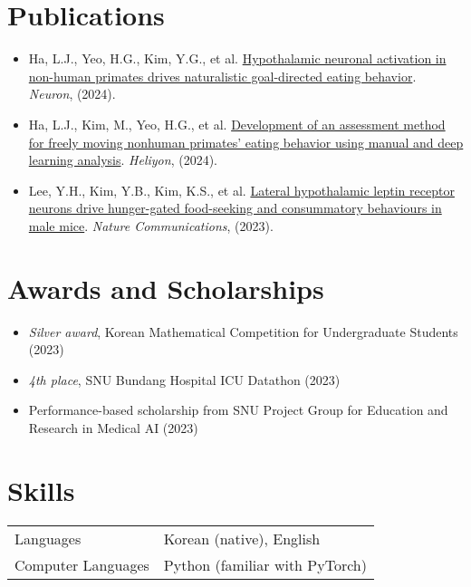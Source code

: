 \documentclass[11pt, a4paper]{article}
\newenvironment{customitemize}
	{\begin{itemize}[leftmargin=*, noitemsep, topsep=0pt, label=$\cdot$]}
	{\end{itemize}}
\begin{document}
\section*{Publications}
\begin{customitemize}
    \item Ha, L.J., Yeo, H.G., Kim, Y.G., et al. \href{https://doi.org/10.1016/j.neuron.2024.03.029}{Hypothalamic neuronal activation in non-human primates drives naturalistic goal-directed eating behavior}. {\it Neuron}, (2024). 
    \item Ha, L.J., Kim, M., Yeo, H.G., et al. \href{https://doi.org/10.1016/j.heliyon.2024.e25561}{Development of an assessment method for freely moving nonhuman primates' eating behavior using manual and deep learning analysis}. {\it Heliyon}, (2024). 
    \item Lee, Y.H., Kim, Y.B., Kim, K.S., et al. \href{https://doi.org/10.1038/s41467-023-37044-4}{Lateral hypothalamic leptin receptor neurons drive hunger-gated food-seeking and consummatory behaviours in male mice}. {\it Nature Communications}, (2023). 
\end{customitemize}


\section*{Awards and Scholarships}
\begin{customitemize}
    \item \textit{Silver award}, Korean Mathematical Competition for Undergraduate Students (2023)
    \item \textit{4th place}, SNU Bundang Hospital ICU Datathon (2023)
    \item Performance-based scholarship from SNU Project Group for Education and Research in Medical AI (2023)
\end{customitemize}


\section*{Skills}
\begin{tabular}{ll}
    Languages & Korean (native), English \\
    Computer Languages & Python (familiar with PyTorch)
\end{tabular}
\end{document}
